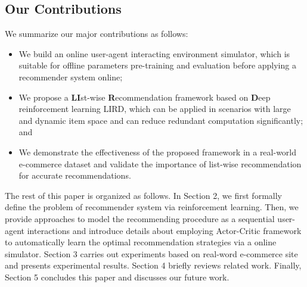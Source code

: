 \subsection{Our Contributions}
We summarize our major contributions as follows: 
\begin{itemize}[leftmargin=*]
	\item We build an online user-agent interacting environment simulator, which is suitable for offline parameters pre-training and evaluation before applying a recommender system online;
	\item We propose a {\bf LI}st-wise {\bf R}ecommendation framework based on {\bf D}eep reinforcement learning LIRD, which can be applied in scenarios with large and dynamic item space and can reduce redundant computation significantly; and 
	\item We demonstrate the effectiveness of the proposed framework in a real-world e-commerce dataset and validate the importance of list-wise recommendation for accurate recommendations.
\end{itemize}

The rest of this paper is organized as follows. In Section 2, we first formally define the problem of recommender system via reinforcement learning. Then, we provide approaches to model the recommending procedure as a sequential user-agent interactions and introduce details about employing Actor-Critic framework to automatically learn the optimal recommendation strategies via a online simulator. Section 3 carries out experiments based on real-word e-commerce site and presents experimental results.  Section 4 briefly reviews related work. Finally, Section 5 concludes this paper and discusses our future work.
